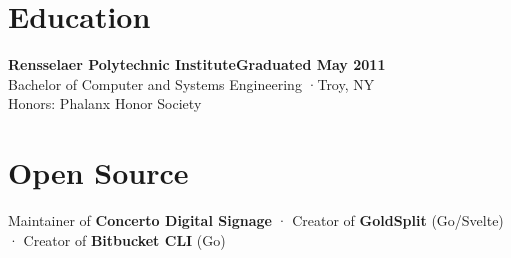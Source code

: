 \documentclass[11pt,letterpaper]{article}
\begin{document}
\section{Education}

{\seriffont\fontsize{13}{16}\selectfont\bfseries Rensselaer Polytechnic Institute}\hfill{\small\color{accent}\bfseries Graduated May 2011}\\
{\small\color{muted}Bachelor of Computer and Systems Engineering \quad·\quad Troy, NY}\\
{\small Honors: Phalanx Honor Society}

\section{Open Source}

Maintainer of \textbf{Concerto Digital Signage} · Creator of \textbf{GoldSplit} (Go/Svelte) · Creator of \textbf{Bitbucket CLI} (Go)
\end{document}
